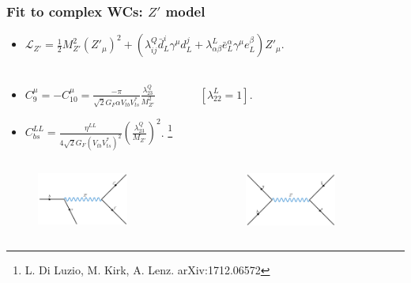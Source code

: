 \documentclass[mathserif, 10pt]{beamer}
\begin{document}
\begin{frame}\frametitle{Fit to complex WCs: $Z'$ model}
    \begin{itemize}
        \item $\mathcal{L}_{Z'} =  \frac{1}{2} M_{Z'}^2 (Z'_\mu)^2 + (\lambda_{ij}^Q \bar{d}^i_L \gamma^\mu d^j_L + \lambda_{\alpha\beta}^L \bar{e}^\alpha_L \gamma^\mu e_L^\beta )Z'_\mu $.~\\~\\
        \item $C_9^\mu = - C_{10}^\mu = \frac{-\pi}{\sqrt{2} G_F \alpha V_{tb} V_{ts}^*}\frac{\lambda^Q_{23}}{M_{Z'}^2}\qquad\qquad [\lambda^L_{22} = 1]$.
\item $C_{bs}^{LL} = \frac{\eta^{LL}}{4\sqrt{2}G_F (V_{tb} V_{ts}^*)^2}\left(\frac{\lambda_{23}^Q}{M_{Z'}}\right)^2$. \footnote[7]{L. Di Luzio, M. Kirk, A. Lenz. arXiv:1712.06572}
    \end{itemize}

    \begin{columns}
        \begin{column}[t]{0.48\textwidth}
            \begin{figure}
                \includegraphics[width=0.7\textwidth]{figures/feynZLFUV.png}
            \end{figure}
        \end{column}
        \begin{column}[t]{0.48\textwidth}
            \begin{figure}
                \includegraphics[width=0.7\textwidth]{figures/feynZBs.png}
            \end{figure}
        \end{column}
    \end{columns}
\end{frame}
\end{document}
